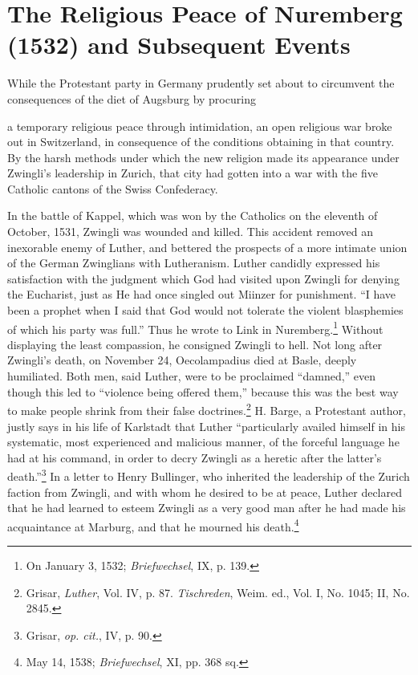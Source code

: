 \section{The Religious Peace of Nuremberg (1532) and Subsequent Events}

While the Protestant party in Germany prudently set about to
circumvent the consequences of the diet of Augsburg by procuring

a temporary religious peace through intimidation, an open religious
war broke out in Switzerland, in consequence of the conditions
obtaining in that country. By the harsh methods under which the
new religion made its appearance under Zwingli’s leadership in
Zurich, that city had gotten into a war with the five Catholic
cantons of the Swiss Confederacy.

In the battle of Kappel, which was won by the Catholics on the
eleventh of October, 1531, Zwingli was wounded and killed. This
accident removed an inexorable enemy of Luther, and bettered the
prospects of a more intimate union of the German Zwinglians with
Lutheranism. Luther candidly expressed his satisfaction with the
judgment which God had visited upon Zwingli for denying the Eucharist,
just as He had once singled out Miinzer for punishment. “I
have been a prophet when I said that God would not tolerate the
violent blasphemies of which his party was full.” Thus he wrote to
Link in Nuremberg.\footnote{On January 3, 1532; \textit{Briefwechsel}, IX, p. 139.}
 Without displaying the least compassion, he
consigned Zwingli to hell. Not long after Zwingli’s death, on November
24, Oecolampadius died at Basle, deeply humiliated. Both men,
said Luther, were to be proclaimed “damned,” even though this led to
“violence being offered them,” because this was the best way to
make people shrink from their false doctrines.\footnote{Grisar, \textit{Luther}, Vol. IV, p. 87. \textit{Tischreden}, Weim. ed., Vol. I, No. 1045; II, No. 2845.}
 H. Barge, a Protestant
author, justly says in his life of Karlstadt that Luther “particularly
availed himself in his systematic, most experienced and malicious
manner, of the forceful language he had at his command, in order
to decry Zwingli as a heretic after the latter’s death.”\footnote{Grisar, \textit{op. cit.}, IV, p. 90.}
 In a letter
to Henry Bullinger, who inherited the leadership of the Zurich
faction from Zwingli, and with whom he desired to be at peace,
Luther declared that he had learned to esteem Zwingli as a very
good man after he had made his acquaintance at Marburg, and that
he mourned his death.\footnote{May 14, 1538; \textit{Briefwechsel}, XI, pp. 368 sq.}


